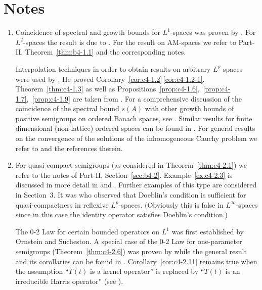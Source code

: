 \section*{Notes}
\begin{enumerate}[label=\emph{Section 4.\arabic*:}, wide, itemsep=1ex]

\item%
Coincidence of spectral and growth bounds for $L^{1}$-spaces was proven by \textcite{derndinger:1980}.
For $L^{2}$-spaces the result is due to \textcite{greinernagel:1983}.
For the result on AM-spaces we refer to 
Part-II, Theorem~\ref{thm:b4-1.1} and the corresponding notes.

Interpolation techniques in order to obtain results on arbitrary $L^{p}$-spaces were used by \textcite{voigt:1985}.
He proved Corollary~\ref{cor:c4-1.2}\,\ref{cor:c4-1.2-1}.
Theorem~\ref{thm:c4-1.3} as well as Propositions~\ref{prop:c4-1.6},~\ref{prop:c4-1.7},~\ref{prop:c4-1.9}  are taken from \textcite{neubrander:1985a}.
For a comprehensive discussion of the coincidence of the spectral bound $s(A)$ with other growth bounds of positive semigroups on ordered Banach spaces, see \textcite{klein:1984}.
Similar results for finite dimensional (non-lattice) ordered spaces can be found in \textcite{stern:1982}.
For general results on the convergence of the solutions of the inhomogeneous Cauchy problem we refer to \textcite{pazy:1983} and the references therein.

\item%
For quasi-compact semigroups (as considered in Theorem~\ref{thm:c4-2.1}) we refer to the notes of Part-II, Section~\ref{sec:b4-2}.
Example~\ref{ex:c4-2.3} is discussed in more detail in \textcite{webb:1984} and \textcite{greiner:1984}.
Further examples of this type are considered in Section~3.
It was \textcite{lotz:1986} who observed that Doeblin's condition is sufficient for quasi-com\-pactness in reflexive $L^{p}$-spaces.
(Obviously this is false in $L^{\infty}$-spaces since in this case the identity operator satisfies Doeblin's condition.)

The 0-2 Law for certain bounded operators on $L^{1}$ was first established by Ornstein and Sucheston.
A special case of the 0-2 Law for one-parameter semigroups (Theorem~\ref{thm:c4-2.6}) was proven by \textcite{winkler:1972} while the general result and its corollaries can be found in \textcite{greiner:1982}.
Corollary~\ref{cor:c4-2.11} remains true when the assumption \enquote{$T(t)$ is a kernel operator} is replaced by \enquote{$T(t)$ is an irreducible Harris operator} (see \textcite{lin:1974}).


\end{enumerate}
